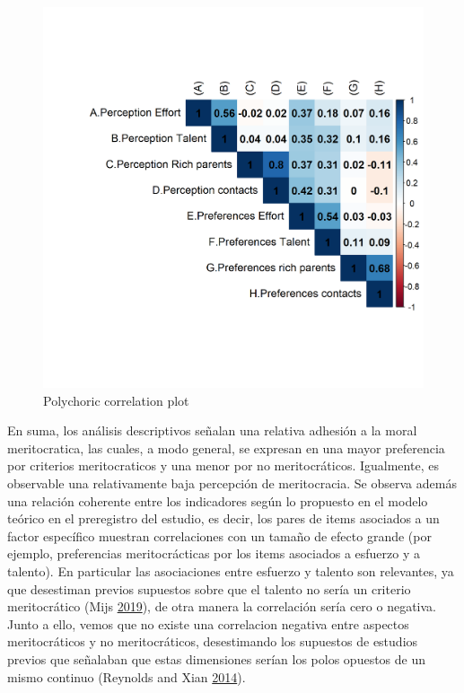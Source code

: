 \documentclass[
]{article}
\begin{document}
\begin{figure}[H]

{\centering \includegraphics[width=0.75\linewidth]{../output/images/corpoly} 

}

\caption{Polychoric correlation plot}\label{fig:corpoly}
\end{figure}

En suma, los análisis descriptivos señalan una relativa adhesión a la moral meritocratica, las cuales, a modo general, se expresan en una mayor preferencia por criterios meritocraticos y una menor por no meritocráticos. Igualmente, es observable una relativamente baja percepción de meritocracia. Se observa además una relación coherente entre los indicadores según lo propuesto en el modelo teórico en el preregistro del estudio, es decir, los pares de items asociados a un factor específico muestran correlaciones con un tamaño de efecto grande (por ejemplo, preferencias meritocrácticas por los items asociados a esfuerzo y a talento). En particular las asociaciones entre esfuerzo y talento son relevantes, ya que desestiman previos supuestos sobre que el talento no sería un criterio meritocrático (Mijs \protect\hyperlink{ref-mijs_paradox_2019}{2019}), de otra manera la correlación sería cero o negativa. Junto a ello, vemos que no existe una correlacion negativa entre aspectos meritocráticos y no meritocráticos, desestimando los supuestos de estudios previos que señalaban que estas dimensiones serían los polos opuestos de un mismo continuo (Reynolds and Xian \protect\hyperlink{ref-reynolds_perceptions_2014}{2014}).
\end{document}
